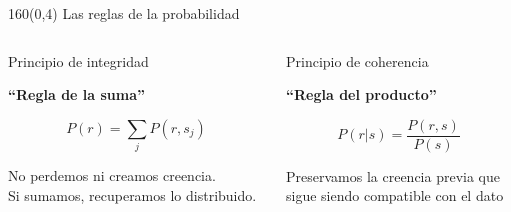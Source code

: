 \documentclass[shownotes,aspectratio=169]{beamer}
\begin{document}
\begin{frame}[plain]
\begin{textblock}{160}(0,4)
\centering \LARGE  Las reglas de la probabilidad
\end{textblock}

\vspace{0.75cm}



\begin{columns}[t]
\begin{column}{0.5\textwidth}
 \centering

 {\Large Principio de integridad}

 \vspace{0.4cm}

\textbf{``Regla de la suma''}


\begin{equation*}
 P(r) = \sum_j P(r,s_j)
\end{equation*}



 \footnotesize
 No perdemos ni creamos creencia. \\
Si sumamos, recuperamos lo distribuido.

 \end{column}
 \begin{column}{0.5\textwidth}

\centering
 {\Large Principio de coherencia}

 \vspace{0.4cm}

\textbf{``Regla del producto''}

\begin{equation*}
 P(r|s)  = \frac{P(r,s)}{P(s)}
\end{equation*}

\vspace{0.1cm}

\footnotesize
Preservamos la creencia previa que \\
sigue siendo compatible con el dato

\end{column}
\end{columns}


\end{frame}
\end{document}
